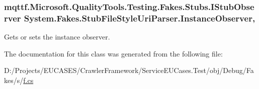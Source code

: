 \hypertarget{class_system_1_1_fakes_1_1_stub_file_style_uri_parser_aa7fa6f92923ef5d418e7c029ea017c4e}{
\subsubsection[{Instance\-Observer}]{\setlength{\rightskip}{0pt plus 5cm}mqttf.\-Microsoft.\-Quality\-Tools.\-Testing.\-Fakes.\-Stubs.\-I\-Stub\-Observer System.\-Fakes.\-Stub\-File\-Style\-Uri\-Parser.\-Instance\-Observer\hspace{0.3cm}{\ttfamily [get]}, {\ttfamily [set]}}}\label{class_system_1_1_fakes_1_1_stub_file_style_uri_parser_aa7fa6f92923ef5d418e7c029ea017c4e}


Gets or sets the instance observer.



The documentation for this class was generated from the following file\-:\begin{DoxyCompactItemize}
\item 
D\-:/\-Projects/\-E\-U\-C\-A\-S\-E\-S/\-Crawler\-Framework/\-Service\-E\-U\-Cases.\-Test/obj/\-Debug/\-Fakes/s/\hyperlink{s_2f_8cs}{f.\-cs}\end{DoxyCompactItemize}
